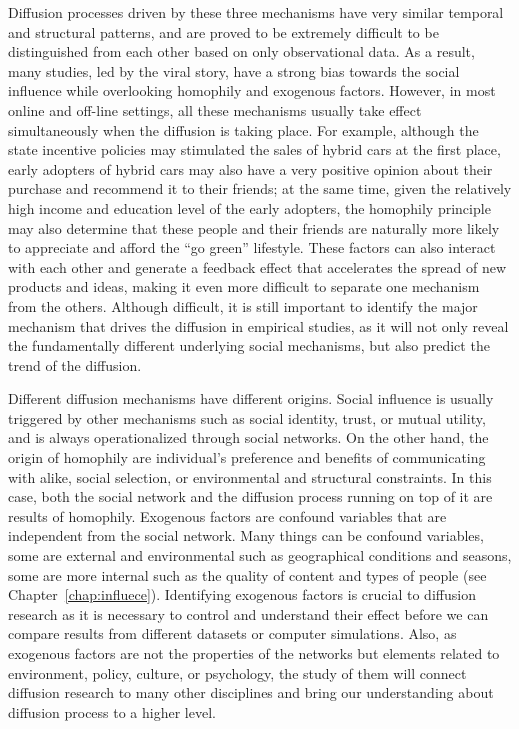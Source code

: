 \documentclass[phd,tocprelim]{cornell}
\begin{document}
Diffusion processes driven by these three mechanisms have very similar temporal and structural patterns, and are proved to be extremely difficult to be distinguished from each other based on only observational data\cite{Aral:2009,Shalizi-2011}. As a result, many studies, led by the viral story, have a strong bias towards the social influence while overlooking homophily and exogenous factors. However, in most online and off-line settings, all these mechanisms usually take effect simultaneously when the diffusion is taking place. For example, although the state incentive policies may stimulated the sales of hybrid cars at the first place, early adopters of hybrid cars may also have a very positive opinion about their purchase and recommend it to their friends; at the same time, given the relatively high income and education level of the early adopters, the homophily principle may also determine that these people and their friends are naturally more likely to appreciate and afford the ``go green'' lifestyle. These factors can also interact with each other and generate a feedback effect that accelerates the spread of new products and ideas\cite{Crandall:2008}, making it even more difficult to separate one mechanism from the others. Although difficult, it is still important to identify the major mechanism that drives the diffusion in empirical studies, as it will not only reveal the fundamentally different underlying social mechanisms, but also predict the trend of the diffusion.

Different diffusion mechanisms have different origins. Social influence is usually triggered by other mechanisms such as social identity, trust, or mutual utility, and is always operationalized through social networks. On the other hand, the origin of homophily are individual's preference and benefits of communicating with alike, social selection, or environmental and structural constraints\cite{kossinets-2008}. In this case, both the social network and the diffusion process running on top of it are results of homophily. Exogenous factors are confound variables that are independent from the social network. Many things can be confound variables, some are external and environmental such as geographical conditions and seasons, some are more internal such as the quality of content\cite{crane:2008} and types of people\cite{Wu-Twitter-2011} (see Chapter~\ref{chap:influece}). Identifying exogenous factors is crucial to diffusion research as it is necessary to control and understand their effect before we can compare results from different datasets or computer simulations. Also, as exogenous factors are not the properties of the networks but elements related to environment, policy, culture, or psychology, the study of them will connect diffusion research to many other disciplines and bring our understanding about diffusion process to a higher level.
\end{document}

